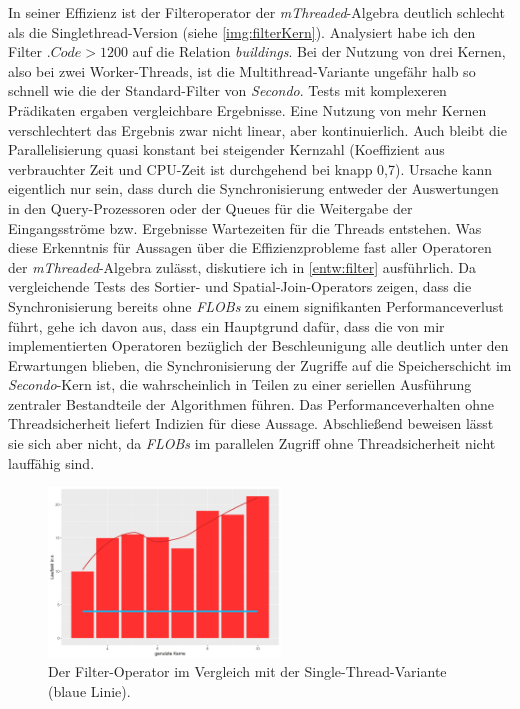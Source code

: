 \documentclass[a4paper,12pt,twoside]{article}
\newcommand{\Fb}[1]{\textit{#1}} %
\begin{document}
In seiner Effizienz ist der Filteroperator der \Fb{mThreaded}-Algebra deutlich schlecht als die Singlethread-Version (siehe \autoref{img:filterKern}). Analysiert habe ich den Filter $.Code > 1200$ auf die Relation \Fb{buildings}. Bei der Nutzung von drei Kernen, also bei zwei Worker-Threads, ist die Multithread-Variante ungefähr halb so schnell wie die der Standard-Filter von \Fb{Secondo}. Tests mit komplexeren Prädikaten ergaben vergleichbare Ergebnisse. Eine Nutzung von mehr Kernen verschlechtert das Ergebnis zwar nicht linear, aber kontinuierlich. Auch bleibt die Parallelisierung quasi konstant bei steigender Kernzahl (Koeffizient aus verbrauchter Zeit und CPU-Zeit ist durchgehend bei knapp 0,7). Ursache kann eigentlich nur sein, dass durch die Synchronisierung entweder der Auswertungen in den Query-Prozessoren oder der Queues für die Weitergabe der Eingangsströme bzw. Ergebnisse  Wartezeiten für die Threads entstehen. Was diese Erkenntnis für Aussagen über die Effizienzprobleme fast aller Operatoren der \Fb{mThreaded}-Algebra zulässt, diskutiere ich in \autoref{entw:filter} ausführlich. Da vergleichende Tests des Sortier- und Spatial-Join-Operators zeigen, dass die Synchronisierung bereits ohne \Fb{FLOBs} zu einem signifikanten Performanceverlust führt, gehe ich davon aus, dass ein Hauptgrund dafür, dass die von mir implementierten Operatoren bezüglich der Beschleunigung alle deutlich unter den Erwartungen blieben, die Synchronisierung der Zugriffe auf die Speicherschicht im \Fb{Secondo}-Kern ist, die wahrscheinlich in Teilen zu einer seriellen Ausführung zentraler Bestandteile der Algorithmen führen. Das Performanceverhalten ohne Threadsicherheit liefert Indizien für diese Aussage. Abschließend beweisen lässt sie sich aber nicht, da \Fb{FLOBs} im parallelen Zugriff ohne Threadsicherheit nicht lauffähig sind.  

\begin{figure}
	\centering
	\includegraphics[width=0.55\textwidth]{Bilder/filter_kerne.png}
	\caption{Der Filter-Operator im Vergleich mit der Single-Thread-Variante (blaue Linie).}
	\label{img:filterKern}
\end{figure}
\end{document}
